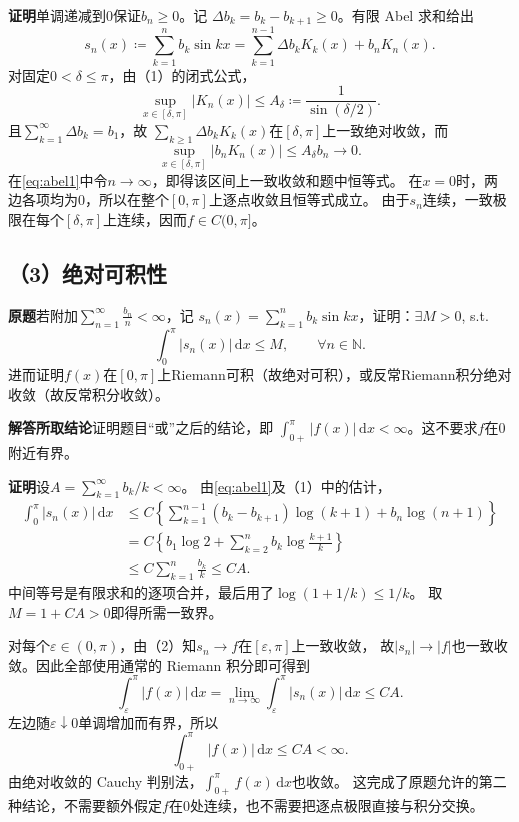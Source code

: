 \documentclass[11pt,a4paper]{ctexart}
\newcommand{\N}{\mathbb N}
\newcommand{\dd}{\,\mathrm d}
\newcommand{\proofstart}{\par\noindent\textbf{证明}\quad}
\begin{document}
\proofstart 单调递减到$0$保证$b_n\ge0$。记
$\Delta b_k=b_k-b_{k+1}\ge0$。有限 Abel 求和给出
\begin{equation}\label{eq:abel1}
 s_n(x)\coloneqq\sum_{k=1}^n b_k\sin kx
 =\sum_{k=1}^{n-1}\Delta b_k K_k(x)+b_nK_n(x).
\end{equation}
对固定$0<\delta\le\pi$，由（1）的闭式公式，
\[
 \sup_{x\in[\delta,\pi]}|K_n(x)|
 \le A_\delta\coloneqq\frac1{\sin(\delta/2)}.
\]
且$\sum_{k=1}^{\infty}\Delta b_k=b_1$，故
$\sum_{k\ge1}\Delta b_kK_k(x)$在$[\delta,\pi]$上一致绝对收敛，而
\[
 \sup_{x\in[\delta,\pi]}|b_nK_n(x)|\le A_\delta b_n\longrightarrow0.
\]
在\eqref{eq:abel1}中令$n\to\infty$，即得该区间上一致收敛和题中恒等式。
在$x=0$时，两边各项均为$0$，所以在整个$[0,\pi]$上逐点收敛且恒等式成立。
由于$s_n$连续，一致极限在每个$[\delta,\pi]$上连续，因而$f\in C(0,\pi]$。

\subsection*{（3）绝对可积性}
\noindent\textbf{原题}\quad 若附加$\sum_{n=1}^{\infty}\frac{b_n}{n}<\infty$，记
$s_n(x)=\sum_{k=1}^n b_k\sin kx$，证明：$\exists M>0$, s.t.
\[
 \int_0^\pi|s_n(x)|\dd x\le M,\qquad\forall n\in\N.
\]
进而证明$f(x)$在$[0,\pi]$上Riemann可积（故绝对可积），或反常Riemann积分绝对收敛（故反常积分收敛）。

\noindent\textbf{解答所取结论}\quad 证明题目“或”之后的结论，即
$\int_{0+}^{\pi}|f(x)|\dd x<\infty$。这不要求$f$在$0$附近有界。

\proofstart 设$A=\sum_{k=1}^{\infty}b_k/k<\infty$。
由\eqref{eq:abel1}及（1）中的估计，
\begin{align*}
 \int_0^\pi|s_n(x)|\dd x
 &\le C\left\{\sum_{k=1}^{n-1}(b_k-b_{k+1})\log(k+1)
       +b_n\log(n+1)\right\}\\
 &=C\left\{b_1\log2+\sum_{k=2}^{n}b_k
                   \log\frac{k+1}{k}\right\}\\
 &\le C\sum_{k=1}^{n}\frac{b_k}{k}\le CA.
\end{align*}
中间等号是有限求和的逐项合并，最后用了$\log(1+1/k)\le1/k$。
取$M=1+CA>0$即得所需一致界。

对每个$\varepsilon\in(0,\pi)$，由（2）知$s_n\to f$在$[\varepsilon,\pi]$上一致收敛，
故$|s_n|\to|f|$也一致收敛。因此全部使用通常的 Riemann 积分即可得到
\[
 \int_\varepsilon^\pi |f(x)|\dd x
 =\lim_{n\to\infty}\int_\varepsilon^\pi |s_n(x)|\dd x\le CA.
\]
左边随$\varepsilon\downarrow0$单调增加而有界，所以
\[
 \boxed{\displaystyle\int_{0+}^\pi |f(x)|\dd x\le CA<\infty.}
\]
由绝对收敛的 Cauchy 判别法，$\int_{0+}^\pi f(x)\dd x$也收敛。
这完成了原题允许的第二种结论，不需要额外假定$f$在$0$处连续，也不需要把逐点极限直接与积分交换。
\end{document}
